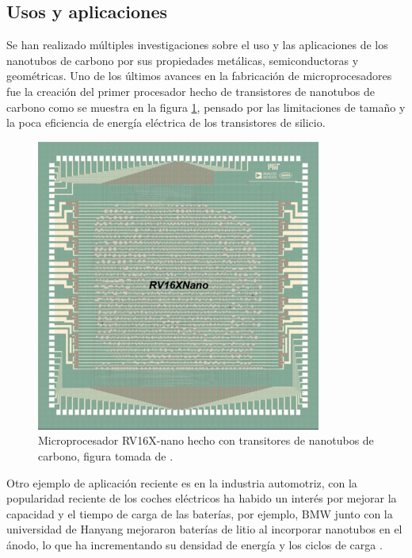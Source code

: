 \subsection{Usos y aplicaciones}

Se han realizado múltiples investigaciones sobre el uso y las aplicaciones de los nanotubos de carbono por sus propiedades metálicas, semiconductoras y geométricas. Uno de los últimos avances en la fabricación de microprocesadores fue la creación del primer procesador hecho de transistores de nanotubos de carbono \cite{Hills2019} como se muestra en la figura \ref{fig:rv16xnano}, pensado por las limitaciones de tamaño y la poca eficiencia de energía eléctrica de los transistores de silicio.\\

\begin{figure}[!h]
    \centering
    \includegraphics[width=.4\textwidth,keepaspectratio=true]{CNT/rv16x-nano.png}
    \caption{Microprocesador RV16X-nano hecho con transitores de nanotubos de carbono, figura tomada de \cite{Hills2019}.}
    \label{fig:rv16xnano}
\end{figure}

Otro ejemplo de aplicación reciente es en la industria automotriz, con la popularidad reciente de los coches eléctricos ha habido un interés por mejorar la capacidad y el tiempo de carga de las baterías, por ejemplo, BMW junto con la universidad de Hanyang mejoraron baterías de litio al incorporar nanotubos en el ánodo, lo que ha incrementando su densidad de energía y los ciclos de carga \cite{lee2016}.\\


